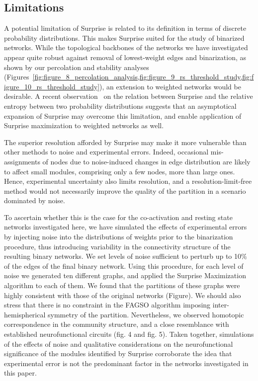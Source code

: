\subsection{Limitations}

A potential limitation of Surprise is related to its definition in terms of discrete probability distributions. This makes Surprise suited for the study of binarized networks. While the topological backbones of the networks we have investigated appear quite robust against removal of lowest-weight edges and binarization, as shown by our percolation and stability analyses (Figures~\ref{fig:figure_8_percolation_analysis,fig:figure_9_rs_threshold_study,fig:figure_10_rs_threshold_study}), an extension to weighted networks would be desirable. A recent observation~\cite{traag2015} on the relation between Surprise and the relative entropy between two probability distributions suggests that an asymptotical expansion of Surprise may overcome this limitation, and enable application of Surprise maximization to weighted networks as well.

The superior resolution afforded by Surprise may make it more vulnerable than other methods to noise and experimental errors. Indeed, occasional mis-assignments of nodes due to noise-induced changes in edge distribution are likely to affect small modules, comprising only a few nodes, more than large ones. Hence, experimental uncertainty also limits resolution, and a resolution-limit-free method would not necessarily improve the quality of the partition in a scenario dominated by noise. 

To ascertain whether this is the case for the co-activation and resting state networks investigated here, we have simulated the effects of experimental errors by injecting  noise into the distributions of weights prior to the binarization procedure, thus introducing variability in the connectivity structure of the resulting binary networks.
We set levels of noise sufficient to perturb up to 10\% of the edges of the final binary network. Using this procedure, for each level of noise we generated ten different graphs, and applied the Surprise Maximization algorithm to each of them.
We found that the partitions of these graphs were highly consistent with those of the original networks (Figure). We should also stress that there is no constraint in the FAGSO algorithm imposing inter-hemispherical symmetry of the partition. Nevertheless, we observed homotopic correspondence in the community structure, and a close resemblance with established neurofunctional circuits (fig. 4 and fig. 5).  Taken together, simulations of the effects of noise and qualitative considerations on the neurofunctional significance of the modules identified by Surprise corroborate the idea that experimental error is not the predominant factor in the networks investigated in this paper.

